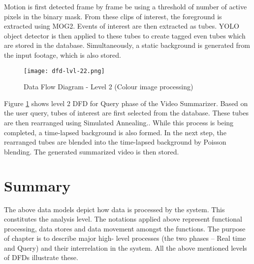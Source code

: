     Motion is first detected frame by frame be using a threshold of number of active pixels in the binary mask. From these clips of interest, the foreground is extracted using MOG2. Events of interest are then extracted as tubes. YOLO object detector is then applied to these tubes to create tagged even tubes which are stored in the database. Simultaneously, a static background is generated from the input footage, which is also stored.

    \begin{figure}[H]
        \centering
        \texttt{[image: dfd-lvl-22.png]}
        \caption {Data Flow Diagram - Level 2 (Colour image processing)}
        \label{img:dfd-lvl-22}
    \end{figure}

    Figure \ref{img:dfd-lvl-22} shows level 2 DFD for Query phase of the Video Summarizer. Based on the user query, tubes of interest are first selected from the database. These tubes are then rearranged using Simulated Annealing.. While this process is being completed, a time-lapsed background is also formed. In the next step, the rearranged tubes are blended into the time-lapsed background by Poisson blending. The generated summarized video is then stored.

\section{Summary}
The above data models depict how data is processed by the system. This constitutes the analysis level. The notations applied above represent functional processing, data stores and data movement amongst the functions. The purpose of chapter is to describe major high- level processes (the two phases – Real time and Query) and their interrelation in the system. All the above mentioned levels of DFDs illustrate these.